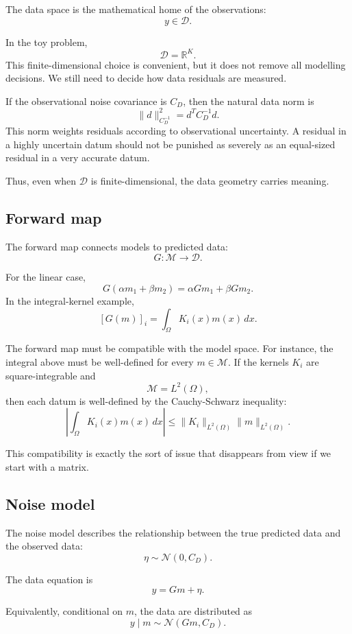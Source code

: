 \documentclass[11pt,a4paper]{book}
\newcommand{\M}{\mathcal{M}}      %
\newcommand{\D}{\mathcal{D}}      %
\newcommand{\noise}{\eta}
\newcommand{\obs}{y}
\newcommand{\G}{G}
\begin{document}
The data space is the mathematical home of the observations:
\[
    \obs \in \D.
\]

In the toy problem,
\[
    \D = \mathbb{R}^K.
\]
This finite-dimensional choice is convenient, but it does not remove all
modelling decisions. We still need to decide how data residuals are measured.

If the observational noise covariance is $C_D$, then the natural data norm is
\[
    \|d\|_{C_D^{-1}}^2
    =
    d^T C_D^{-1}d.
\]
This norm weights residuals according to observational uncertainty. A residual
in a highly uncertain datum should not be punished as severely as an equal-sized
residual in a very accurate datum.

Thus, even when $\D$ is finite-dimensional, the data geometry carries meaning.

\subsection{Forward map}

The forward map connects models to predicted data:
\[
    \G : \M \to \D.
\]

For the linear case,
\[
    \G(\alpha m_1+\beta m_2)
    =
    \alpha \G m_1+\beta \G m_2.
\]
In the integral-kernel example,
\[
    [\G(m)]_i
    =
    \int_\Omega K_i(x)m(x)\,dx.
\]

The forward map must be compatible with the model space. For instance, the
integral above must be well-defined for every $m\in\M$. If the kernels $K_i$
are square-integrable and
\[
    \M = L^2(\Omega),
\]
then each datum is well-defined by the Cauchy-Schwarz inequality:
\[
    \left|
    \int_\Omega K_i(x)m(x)\,dx
    \right|
    \leq
    \|K_i\|_{L^2(\Omega)}
    \|m\|_{L^2(\Omega)}.
\]

This compatibility is exactly the sort of issue that disappears from view if we
start with a matrix.

\subsection{Noise model}

The noise model describes the relationship between the true predicted data and
the observed data:
\[
    \noise \sim \mathcal{N}(0,C_D).
\]

The data equation is
\[
    \obs = \G m + \noise.
\]

Equivalently, conditional on $m$, the data are distributed as
\[
    \obs \mid m
    \sim
    \mathcal{N}(\G m,C_D).
\]
\end{document}
